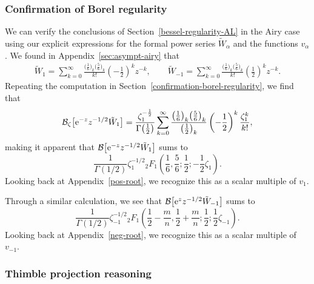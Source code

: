 \documentclass[pdftex]{sigma}
\newcommand{\borel}{\mathcal{B}}
\numberwithin{equation}{section}
\begin{document}
\subsubsection{Confirmation of Borel regularity}\label{confirmation-borel-regularity-airy}
%
We can verify the conclusions of Section~\ref{bessel-regularity-AL} in the Airy case using our explicit expressions for the formal power series $\tilde{W}_\alpha$ and the functions $v_\alpha$. We found in Appendix~\ref{sec:asympt-airy} that
\begin{align*}
\tilde{W}_1 = \sum_{k = 0}^{\infty} \frac{\bigl(\frac{1}{6}\bigr)_k \bigl(\frac{5}{6}\bigr)_k}{k!} \left(-\frac{1}{2}\right)^k z^{-k} ,\qquad
\tilde{W}_{-1} = \sum_{k = 0}^{\infty} \frac{\bigl(\frac{1}{6}\bigr)_k \bigl(\frac{5}{6}\bigr)_k}{k!} \left(\frac{1}{2}\right)^k z^{-k}.
\end{align*}
Repeating the computation in Section~\ref{confirmation-borel-regularity}, we find that
\[ \borel_\zeta \bigl[ {\rm e}^{-z} z^{-1/2} \tilde{W}_1 \bigr] = \frac{\zeta_1^{-\frac{1}{2}}}{\Gamma\bigl(\frac{1}{2}\bigr)} \sum_{k = 0}^{\infty} \frac{\bigl(\frac{1}{6}\bigr)_k \bigl(\frac{5}{6}\bigr)_k}{\bigl(\frac{1}{2}\bigr)_k} \left(-\frac{1}{2}\right)^k \frac{\zeta_1^k}{k!}, \]
making it apparent that $\borel\bigl[ {\rm e}^{-z} z^{-1/2} \tilde{W}_1 \bigr]$ sums to
\[ \frac{1}{\Gamma(1/2)} \zeta_1^{-1/2} {}_2F_1\left(\frac{1}{6}, \frac{5}{6}; \frac{1}{2}; -\frac{1}{2}\zeta_1\right). \]
Looking back at Appendix~\ref{pos-root}, we recognize this as a scalar multiple of $v_1$.

Through a similar calculation, we see that $\borel\bigl[ {\rm e}^z z^{-1/2} \tilde{W}_{-1} \bigr]$ sums to
\[ \frac{1}{\Gamma(1/2)} \zeta_{-1}^{-1/2} {}_2F_1\left(\frac{1}{2}-\frac{m}{n}, \frac{1}{2}+\frac{m}{n}; \frac{1}{2}; \frac{1}{2}\zeta_{-1}\right). \]
Looking back at Appendix~\ref{neg-root}, we recognize this as a scalar multiple of $v_{-1}$.

\subsubsection{Thimble projection reasoning}\label{contour-argument-airy}
\end{document}
